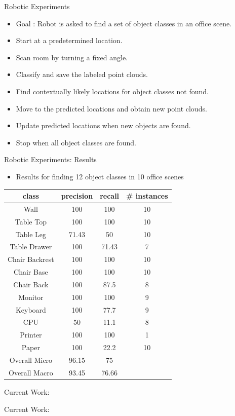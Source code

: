 \documentclass{beamer}
\begin{document}
\begin{frame}{Robotic Experiments}
\begin{itemize}
\item Goal : Robot is asked to find a set of object classes in an office scene.
\item Start at a predetermined location. 
\item Scan room by turning a fixed angle.
\item Classify and save the labeled point clouds. 
\item Find contextually likely locations for object classes not found.
\item Move to the predicted locations and obtain new point clouds.
\item Update predicted locations when new objects are found.
\item Stop when all object classes are found.

\end{itemize}

\end{frame}

\begin{frame}{Robotic Experiments: Results}

\begin{itemize}

\item Results for finding 12 object classes in 10 office scenes

\end{itemize}

\begin {center}
{\footnotesize 
\begin{tabular}{c | c | c | c}
class & precision & recall & \# instances\\
\hline
Wall  & 100 & 100 & 10\\
Table Top  & 100  &100 & 10 \\
Table Leg & 71.43 & 50 & 10 \\
Table Drawer & 100 & 71.43 & 7\\
Chair Backrest & 100 & 100 & 10 \\
Chair Base & 100  & 100 & 10 \\
Chair Back & 100 & 87.5 & 8 \\
Monitor & 100 & 100 & 9 \\
Keyboard & 100 & 77.7 & 9\\
CPU & 50 & 11.1 & 8 \\ 
Printer & 100 & 100 & 1\\
Paper & 100 & 22.2 & 10\\
\hline
Overall Micro & 96.15 & 75 \\
Overall Macro & 93.45 & 76.66 \\

\end{tabular}
}
\end{center}

\end{frame}

\begin{frame}{Current Work: }


\end{frame}

\begin{frame}{Current Work: }
\end{frame}
\end{document}
